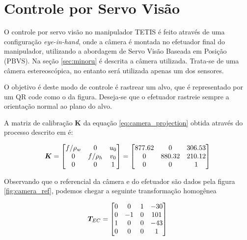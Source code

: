 \section{Controle por Servo Visão}
O controle por servo visão no manipulador TETIS é feito através de uma configuração \textit{eye-in-hand}, onde a câmera é montada no efetuador final do manipulador, utilizando a abordagem de Servo Visão Baseada em Posição (PBVS). Na seção \ref{sec:minoru} é descrita a câmera utilizada. Trata-se de uma câmera estereoscópica, no entanto será utilizada apenas um dos sensores.



O objetivo é deste modo de controle é rastrear um alvo, que é representado por um QR code como o da figura. Deseja-se que o efetuador rastreie sempre a orientação normal ao plano do alvo.

A matriz de calibração $\bm{K}$ da equação \eqref{eq:camera_projection} obtida através do processo descrito em \cite{calibration_tutorial} é:

\begin{equation}
\bm{K} = \begin{bmatrix}
	f/\rho_w & 0 & u_0 \\
	0        & f/\rho_h &v_0 \\
	0 & 0 & 1 \\
\end{bmatrix}
=
\begin{bmatrix}
	877.62 	& 0 		& 306.53 \\
	0  		& 880.32 	& 210.12 \\
	0   	& 0 		& 1 \\	
\end{bmatrix}	
\end{equation}

Observando que o referencial da câmera e do efetuador são dados pela figura \ref{fig:camera_ref}, podemos chegar a seguinte transformação homogênea

\begin{equation} \label{eq:tec}
\bm{T}_{EC} = \begin{bmatrix}
	0 & 0 & 1 & -30 \\
	0 & -1 & 0 & 101 \\
	1 &  0 & 0 & -43 \\
	0 &  0 & 0 &  1
\end{bmatrix}
\end{equation}

